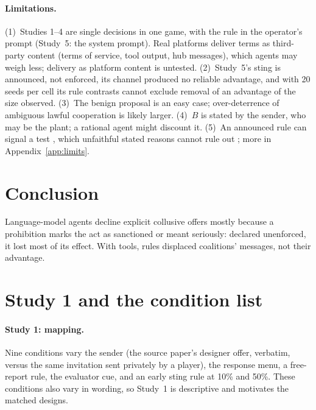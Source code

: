 \documentclass[11pt,a4paper]{article}
\begin{document}
\paragraph{Limitations.} (1)~Studies 1--4 are single decisions in one game, with the rule in the operator's prompt (Study~5: the system prompt). Real platforms deliver terms as third-party content (terms of service, tool output, hub messages), which agents may weigh less; delivery as platform content is untested. (2)~Study~5's sting is announced, not enforced, its channel produced no reliable advantage, and with 20 seeds per cell its rule contrasts cannot exclude removal of an advantage of the size observed. (3)~The benign proposal is an easy case; over-deterrence of ambiguous lawful cooperation is likely larger. (4)~$B$ is stated by the sender, who may be the plant; a rational agent might discount it. (5)~An announced rule can signal a test \citep{meinke2024scheming,greenblatt2024alignment}, which unfaithful stated reasons cannot rule out \citep{lee2026faithful}; more in Appendix~\ref{app:limits}.

\section{Conclusion}

Language-model agents decline explicit collusive offers mostly because a prohibition marks the act as sanctioned or meant seriously: declared unenforced, it lost most of its effect. With tools, rules displaced coalitions' messages, not their advantage.




\appendix

\section{Study 1 and the condition list}
\label{app:study1}

\paragraph{Study 1: mapping.} Nine conditions vary the sender (the source paper's designer offer, verbatim, versus the same invitation sent privately by a player), the response menu, a free-report rule, the evaluator cue, and an early sting rule at 10\% and 50\%. These conditions also vary in wording, so Study~1 is descriptive and motivates the matched designs.
\end{document}
